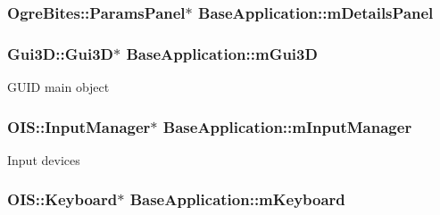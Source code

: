 \hypertarget{class_base_application_a6a11054ca61efdf558e0ff1b2de43a12}{
\subsubsection[{m\-Details\-Panel}]{\setlength{\rightskip}{0pt plus 5cm}Ogre\-Bites\-::\-Params\-Panel$\ast$ Base\-Application\-::m\-Details\-Panel\hspace{0.3cm}{\ttfamily [protected]}}}\label{class_base_application_a6a11054ca61efdf558e0ff1b2de43a12}
\hypertarget{class_base_application_aaa51f685a5ab1f23b6152f12dbdd86a5}{
\subsubsection[{m\-Gui3\-D}]{\setlength{\rightskip}{0pt plus 5cm}Gui3\-D\-::\-Gui3\-D$\ast$ Base\-Application\-::m\-Gui3\-D\hspace{0.3cm}{\ttfamily [protected]}}}\label{class_base_application_aaa51f685a5ab1f23b6152f12dbdd86a5}
G\-U\-I\-D main object \hypertarget{class_base_application_abc9503c8462e225b5d0d55c952d9e4a9}{
\subsubsection[{m\-Input\-Manager}]{\setlength{\rightskip}{0pt plus 5cm}O\-I\-S\-::\-Input\-Manager$\ast$ Base\-Application\-::m\-Input\-Manager\hspace{0.3cm}{\ttfamily [protected]}}}\label{class_base_application_abc9503c8462e225b5d0d55c952d9e4a9}
Input devices \hypertarget{class_base_application_a9d6e19cf50c47379fbaae55bff28079c}{
\subsubsection[{m\-Keyboard}]{\setlength{\rightskip}{0pt plus 5cm}O\-I\-S\-::\-Keyboard$\ast$ Base\-Application\-::m\-Keyboard\hspace{0.3cm}{\ttfamily [protected]}}}\label{class_base_application_a9d6e19cf50c47379fbaae55bff28079c}
